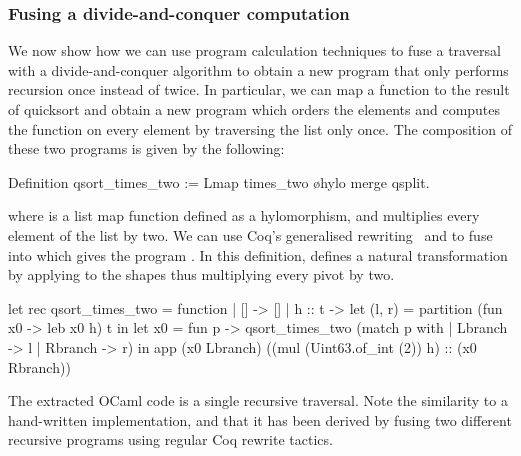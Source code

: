 \documentclass[a4paper,UKenglish,cleveref, autoref, thm-restate]{lipics-v2021}
\begin{document}
\subsubsection{Fusing a divide-and-conquer computation}
We now show how we can use program calculation techniques to fuse a traversal
with a  divide-and-conquer algorithm to obtain a new program that only performs
recursion once instead of twice. In particular, we can map a function to the
result of quicksort and obtain a new program which orders the elements and
computes the function on every element by traversing the list only once. The
composition of these two programs is given by the following:
\begin{coqcode}
Definition qsort_times_two := Lmap times_two \o hylo merge qsplit.
\end{coqcode}
where  is a list map function defined as a hylomorphism, and
 multiplies every element of the list by two. We can use Coq's
generalised rewriting~\cite{Sozeau09} and  to fuse  into
 which gives the program .
In this definition,  defines a natural transformation by applying
 to the shapes thus multiplying every pivot by two.

\begin{ocamlcode}
let rec qsort_times_two = function | [] -> []
| h :: t -> let (l, r) = partition (fun x0 -> leb x0 h) t in
            let x0 = fun p -> qsort_times_two (match p with
                                 | Lbranch -> l | Rbranch -> r) in
            app (x0 Lbranch) ((mul (Uint63.of_int (2)) h) :: (x0 Rbranch))
\end{ocamlcode}
The extracted OCaml code is a single recursive traversal. Note the similarity to
a hand-written implementation, and that it has been derived by fusing two
different recursive programs using regular Coq rewrite tactics.
\newcommand{\Id}{\text{Id}}
\end{document}
